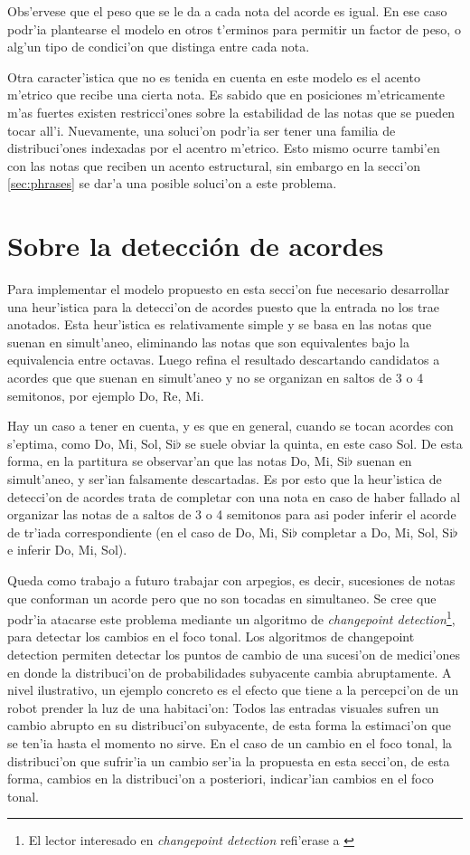 Obs'ervese que el peso que se le da a cada nota del acorde es igual. En ese caso podr'ia plantearse el modelo en otros t'erminos para permitir un factor de peso, o
alg'un tipo de condici'on que distinga entre cada nota. 

Otra caracter'istica que no es tenida en cuenta en este modelo es el acento m'etrico que recibe una cierta nota. Es sabido que en posiciones m'etricamente m'as fuertes
existen restricci'ones sobre la estabilidad de las notas que se pueden tocar all'i. Nuevamente, una soluci'on podr'ia ser tener una familia de distribuci'ones indexadas
por el acentro m'etrico. Esto mismo ocurre tambi'en con las notas que reciben un acento estructural, sin embargo en la secci'on \ref{sec:phrases} se dar'a una posible
soluci'on a este problema. 

\section{Sobre la detecci\'on de acordes}
Para implementar el modelo propuesto en esta secci'on fue necesario desarrollar una heur'istica para la detecci'on de acordes puesto que la entrada no los trae anotados. 
Esta heur'istica es relativamente simple y se basa en las notas
que suenan en simult'aneo, eliminando las notas que son equivalentes bajo la equivalencia entre octavas. Luego refina el resultado descartando candidatos a acordes que 
que suenan en simult'aneo y no se organizan en saltos de 3 o 4 semitonos, por ejemplo Do, Re, Mi. 

Hay un caso a tener en cuenta, y es que en general, cuando se tocan acordes
con s'eptima, como Do, Mi, Sol, Si$\flat$ se suele obviar la quinta, en este caso Sol. De esta forma, en la partitura se observar'an que las notas Do, Mi, Si$\flat$ suenan
en simult'aneo, y ser'ian falsamente descartadas.  Es por esto que la heur'istica de detecci'on de acordes trata de completar 
con una nota en caso de haber fallado al organizar las notas de a saltos de 3 o 4 semitonos para asi poder inferir el acorde de tr'iada correspondiente (en 
el caso de Do, Mi, Si$\flat$ completar a Do, Mi, Sol, Si$\flat$ e inferir Do, Mi, Sol). 

Queda como trabajo a futuro trabajar con arpegios, es decir, sucesiones de notas que conforman un acorde pero que no son tocadas en simultaneo. 
Se cree que podr'ia atacarse este problema mediante un algoritmo de \emph{changepoint detection}\footnote{El lector interesado en \emph{changepoint detection} refi'erase 
a \cite{adams-mackay-2007}}, para detectar los cambios en el foco tonal. Los algoritmos de changepoint 
detection permiten detectar los puntos de cambio de una sucesi'on de medici'ones en donde la distribuci'on de probabilidades subyacente cambia abruptamente.
A nivel ilustrativo, un ejemplo concreto es el efecto que tiene a la percepci'on de un robot prender la luz de una habitaci'on: Todos las entradas visuales 
sufren un cambio abrupto en su distribuci'on subyacente, de esta forma la estimaci'on que se ten'ia hasta el momento no sirve. En el caso de un cambio
en el foco tonal, la distribuci'on que sufrir'ia un cambio ser'ia la propuesta en esta secci'on, de esta forma, cambios en la distribuci'on a posteriori, indicar'ian
cambios en el foco tonal.

